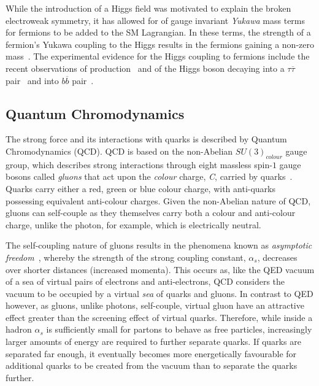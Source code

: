 While the introduction of a Higgs field was motivated to explain the broken electroweak symmetry, it has allowed for of gauge invariant \emph{Yukawa} mass terms for fermions to be added to the SM Lagrangian.
In these terms, the strength of a fermion's Yukawa coupling to the Higgs results in the fermions gaining a non-zero mass~\cite{Cheng:1985bj}.
The experimental evidence for the Higgs coupling to fermions include the recent observations of \ttH production~\cite{Sirunyan:2018hoz} and of the Higgs boson decaying into a $\tau \overline{\tau}$ pair~\cite{CERN-EP-2018-221} and into $b \overline{b}$ pair~\cite{Sirunyan:2017guj}.

\subsection{Quantum Chromodynamics}\label{subsec:QCD}
The strong force and its interactions with quarks is described by Quantum Chromodynamics (QCD).
QCD is based on the non-Abelian $SU(3)_{colour}$ gauge group, which describes strong interactions through eight massless spin-$1$ gauge bosons called \emph{gluons} that act upon the \emph{colour} charge, \emph{C}, carried by quarks~\cite{ElectroweakStrong}.
Quarks carry either a red, green or blue colour charge, with anti-quarks possessing equivalent anti-colour charges.
Given the non-Abelian nature of QCD, gluons can self-couple as they themselves carry both a colour and anti-colour charge, unlike the photon, for example, which is electrically neutral.

The self-coupling nature of gluons results in the phenomena known as \emph{asymptotic freedom}~\cite{ElectroweakStrong,coughlan2006ideas,devenish2004deep}, whereby the strength of the strong coupling constant, $\alpha_{s}$, decreases over shorter distances (increased momenta).
This occurs as, like the QED vacuum of a sea of virtual pairs of electrons and anti-electrons, QCD considers the vacuum to be occupied by a virtual \emph{sea} of quarks and gluons.
In contrast to QED however, as gluons, unlike photons, self-couple, virtual gluon have an attractive effect greater than the screening effect of virtual quarks.
Therefore, while inside a hadron $\alpha_{s}$ is sufficiently small for partons to behave as free particles, increasingly larger amounts of energy are required to further separate quarks.
If quarks are separated far enough, it eventually becomes more energetically favourable for additional quarks to be created from the vacuum than to separate the quarks further.

